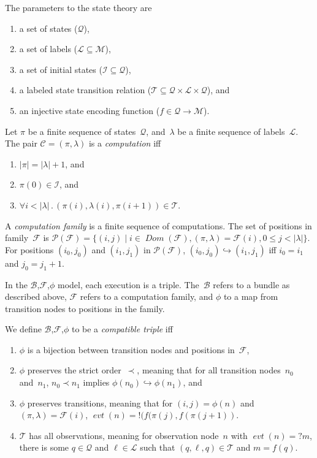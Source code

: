 \documentclass[12pt]{article}
\newcommand{\fn}[1]{\ensuremath{\operatorname{\mathit{#1}}}}
\newcommand{\sync}{\mathord !}
\newcommand{\obsv}{\mathord ?}
\newcommand{\all}[1]{\forall#1\mathpunct.}
\newcommand{\msg}{\ensuremath{\mathcal{M}}}
\newcommand{\bun}{\ensuremath{\mathcal{B}}}
\newcommand{\sta}{\ensuremath{\mathcal{Q}}}
\newcommand{\init}{\ensuremath{\mathcal{I}}}
\newcommand{\tran}{\ensuremath{\mathcal{T}}}
\newcommand{\pth}{\ensuremath{\pi}}
\newcommand{\evt}{\fn{evt}}
\newcommand{\dom}{\fn{Dom}}
\newcommand{\comp}{\ensuremath{\mathcal{C}}}
\newcommand{\family}{\ensuremath{\mathcal{F}}}
\newcommand{\pos}{\ensuremath{\mathcal{P}}}
\newcommand{\lab}{\ensuremath{\mathcal{L}}}
\newcommand{\labs}{\ensuremath{\lambda}}
\begin{document}
The parameters to the state theory are
\begin{enumerate}
\item a set of states (\sta),
\item a set of labels ($\lab\subseteq\msg$),
\item a set of initial states ($\init\subseteq\sta$),
\item a labeled state transition relation
  ($\tran\subseteq\sta\times\lab\times\sta$), and
\item an injective state encoding function ($f\in\sta\to\msg$).
\end{enumerate}

Let {\pth} be a finite sequence of states~\sta, and~{\labs} be a
finite sequence of labels~\lab.  The pair $\comp=(\pth,\labs)$ is a
\emph{computation} iff
\begin{enumerate}
\item $|\pth|=|\labs|+1$, and
\item $\pth(0)\in\init$, and
\item \(\all{i<|\labs|}(\pth(i),\labs(i),\pth(i+1))\in\tran\).
\end{enumerate}
A \emph{computation family} is a finite sequence of computations.  The
set of positions in family~{\family } is \(\pos(\family)= \{(i, j)\mid
i\in\dom(\family), (\pth,\labs)=\family(i), 0\leq j < |\labs|\}\).
For positions $(i_0,j_0)$ and $(i_1,j_1)$ in $\pos(\family)$,
$(i_0,j_0)\hookrightarrow(i_1,j_1)$ iff $i_0=i_1$ and $j_0=j_1+1$.

In the \bun,\family,$\phi$ model, each execution is a triple.
The~{\bun} refers to a bundle as described above, {\family} refers to
a computation family, and $\phi$ to a map from transition nodes to
positions in the family.

We define \bun,\family,$\phi$ to be a \emph{compatible triple} iff
\begin{enumerate}
\item $\phi$ is a bijection between transition nodes and 
  positions in~\family,
\item $\phi$ preserves the strict order~$\prec$, meaning
  that for all transition nodes~$n_0$ and~$n_1$, $n_0\prec n_1$ implies
  $\phi(n_0)\hookrightarrow\phi(n_1)$, and
\item $\phi$ preserves transitions, meaning that for 
$(i,j)=\phi(n)$ and $(\pth,\labs)=\family(i)$,
\marginpar{!}
$\evt(n)=\sync(f(\pth(j),f(\pth(j+1))$.
\item {\tran} has all observations, meaning for observation node~$n$
  with $\evt(n)=\obsv m$, there is some $q\in\sta$ and $\ell\in\lab$
  such that $(q,\ell,q)\in\tran$ and $m=f(q)$.
\end{enumerate}
\end{document}
